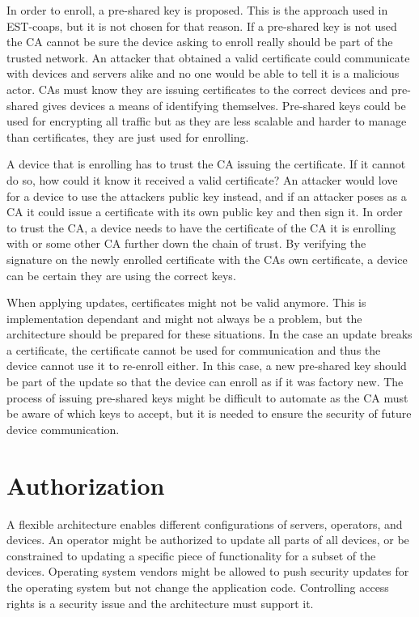 \documentclass[0-thesis.tex]{subfiles}
\begin{document}
In order to enroll, a pre-shared key is proposed. This is the approach used in EST-coaps,
but it is not chosen for that reason. If a pre-shared key is not used the CA cannot be
sure the device asking to enroll really should be part of the trusted network. An attacker
that obtained a valid certificate could communicate with devices and servers alike and no
one would be able to tell it is a malicious actor. CAs must know they are issuing
certificates to the correct devices and pre-shared gives devices a means of identifying
themselves. Pre-shared keys could be used for encrypting all traffic but as they are less
scalable and harder to manage than certificates, they are just used for enrolling.

A device that is enrolling has to trust the CA issuing the certificate. If it cannot do
so, how could it know it received a valid certificate? An attacker would love for a device
to use the attackers public key instead, and if an attacker poses as a CA it could issue a
certificate with its own public key and then sign it. In order to trust the CA, a device
needs to have the certificate of the CA it is enrolling with or some other CA further down
the chain of trust. By verifying the signature on the newly enrolled certificate with the
CAs own certificate, a device can be certain they are using the correct keys.

When applying updates, certificates might not be valid anymore. This is implementation
dependant and might not always be a problem, but the architecture should be prepared for
these situations. In the case an update breaks a certificate, the certificate cannot be
used for communication and thus the device cannot use it to re-enroll either. In this
case, a new pre-shared key should be part of the update so that the device can enroll as
if it was factory new. The process of issuing pre-shared keys might be difficult to
automate as the CA must be aware of which keys to accept, but it is needed to ensure the
security of future device communication.

\section{Authorization}
\label{sec:authorization}
A flexible architecture enables different configurations of servers, operators, and
devices. An operator might be authorized to update all parts of all devices, or be
constrained to updating a specific piece of functionality for a subset of the devices.
Operating system vendors might be allowed to push security updates for the operating
system but not change the application code. Controlling access rights is a security issue
and the architecture must support it.
\end{document}
